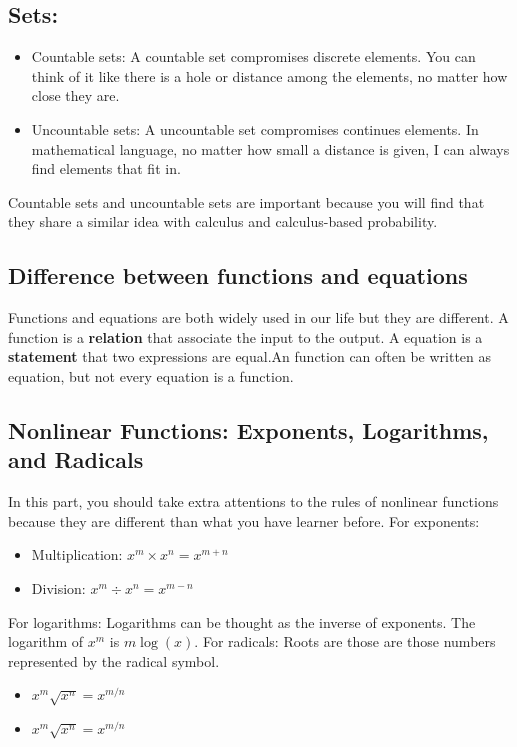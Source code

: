 \documentclass{article}
\begin{document}
\subsection{Sets:}
\begin{itemize}
    \item Countable sets: A countable set compromises discrete elements. You can think of it like there is a hole or distance among the elements, no matter how close they are. 
    \item Uncountable sets: A uncountable set compromises continues elements. In mathematical language, no matter how small a distance is given, I can always find elements that fit in.
\end{itemize}
Countable sets and uncountable sets are important because you will find that they share a similar idea with calculus and calculus-based probability. 


\subsection{Difference between functions and equations}
Functions and equations are both widely used in our life but they are different. A function is a \textbf{relation} that associate the input to the output. A equation is a \textbf{statement} that two expressions are equal.An function can often be written as equation, but not every equation is a function. 

\subsection{Nonlinear Functions: Exponents, Logarithms, and Radicals}
In this part, you should take extra attentions to the rules of nonlinear functions because they are different than what you have learner before. \newline For exponents:
\begin{itemize}
    \item Multiplication: \(x^m \times x^n = x^{m+n} \) 
    \item Division: \(x^m \div x^n = x^{m-n} \)
\end{itemize}
For logarithms:
Logarithms can be thought as the inverse of exponents. The logarithm of \(x^m\) is \(m\log(x)\).
\newline For radicals:
Roots are those are those numbers represented by the radical symbol.
\begin{itemize}
    \item \(x^m \sqrt{x^n} = x^{m/n} \)
    \item \(x^m \sqrt{x^n} = x^{m/n} \)
\end{itemize}
\end{document}
